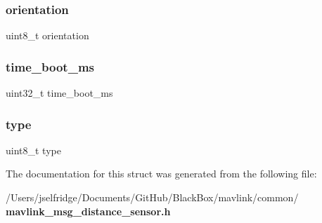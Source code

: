 \subsubsection{orientation}
{\footnotesize\ttfamily uint8\+\_\+t orientation}

\mbox{\label{struct____mavlink__distance__sensor__t_ad4e96ee46e36270d1ab66060e46f8c79}} 
\subsubsection{time\+\_\+boot\+\_\+ms}
{\footnotesize\ttfamily uint32\+\_\+t time\+\_\+boot\+\_\+ms}

\mbox{\label{struct____mavlink__distance__sensor__t_a1d127017fb298b889f4ba24752d08b8e}} 
\subsubsection{type}
{\footnotesize\ttfamily uint8\+\_\+t type}



The documentation for this struct was generated from the following file\+:\begin{DoxyCompactItemize}
\item 
/\+Users/jselfridge/\+Documents/\+Git\+Hub/\+Black\+Box/mavlink/common/\textbf{ mavlink\+\_\+msg\+\_\+distance\+\_\+sensor.\+h}\end{DoxyCompactItemize}
